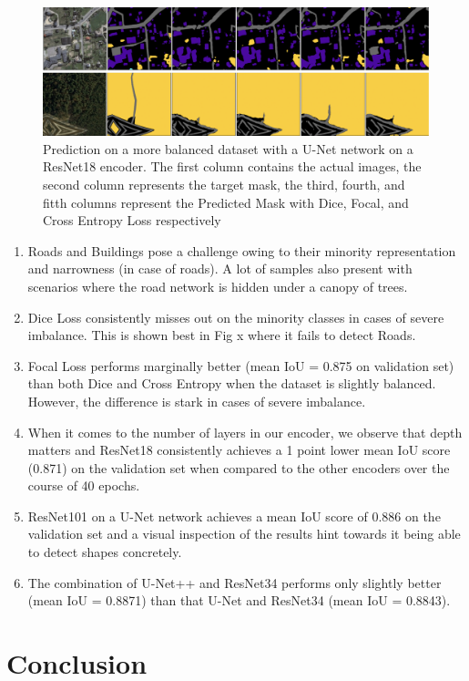 \documentclass[conference]{IEEEtran}
\begin{document}
\begin{figure}
    \includegraphics[width=\textwidth]{images/encoders/encoders-vis.png}
    \caption{Prediction on a more balanced dataset with a U-Net network on a ResNet18 encoder. The first column contains the actual images, the second column represents the target mask, the third, fourth, and fitth columns represent the Predicted Mask with Dice, Focal, and Cross Entropy Loss respectively}
\end{figure}
\begin{enumerate}
    \item Roads and Buildings pose a challenge owing to their minority representation and narrowness (in case of roads). A lot of samples also present with scenarios where the road network is hidden under a canopy of trees.
    \item Dice Loss consistently misses out on the minority classes in cases of severe imbalance. This is shown best in Fig x where it fails to detect Roads.
    \item Focal Loss performs marginally better (mean IoU = 0.875 on validation set) than both Dice and Cross Entropy when the dataset is slightly balanced. However, the difference is stark in cases of severe imbalance.
    \item When it comes to the number of layers in our encoder, we observe that depth matters and ResNet18 consistently achieves a 1 point lower mean IoU score (0.871) on the validation set when compared to the other encoders over the course of 40 epochs.
    \item ResNet101 on a U-Net network achieves a mean IoU score of 0.886 on the validation set and a visual inspection of the results hint towards it being able to detect shapes concretely.
    \item The combination of U-Net++ and ResNet34 performs only slightly better (mean IoU = 0.8871) than that U-Net and ResNet34 (mean IoU = 0.8843).
\end{enumerate}

\section{Conclusion}
\end{document}
